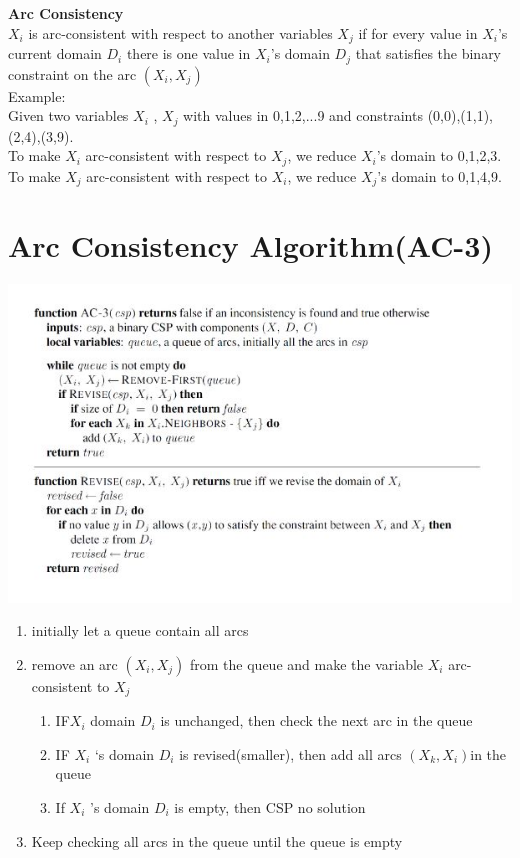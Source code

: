 \textbf{Arc Consistency}\\
$X_i$ is arc-consistent with respect to another variables $X_j$ if for every value in $X_i$’s current domain $D_i$ there is one value in $X_i$’s domain $D_j$ that satisfies the binary constraint on the arc $(X_i , X_j)$\\[3ex]

Example:\\
Given two variables $X_i$ , $X_j$ with values in {0,1,2,...9} and constraints 
(0,0),(1,1),(2,4),(3,9).\\
To make $X_i$ arc-consistent with respect to $X_j$, we reduce $X_i$’s domain to {0,1,2,3}.\\
To make $X_j$ arc-consistent with respect to $X_i$, we reduce $X_j$’s domain to {0,1,4,9}.\\

\section{Arc Consistency Algorithm(AC-3)}
\includegraphics[scale=1]{chap1_pics/1nAyMlelLl-LW-ECO-Akl5AsNAugdRshrNF4o7Q.png} 
\begin{enumerate}
\item initially let a queue contain all arcs
\item remove an arc $(X_i , X_j)$ from the queue and make the variable $X_i$ arc-consistent to $X_j$
\begin{enumerate}
\item IF$ X_i$ domain $D_i$ is unchanged, then check the next arc in the queue
\item IF $X_i$ ‘s domain $D_i$ is revised(smaller), then add all arcs $(X_k, X_i) $in the queue 
\item If $X_i$ ’s domain $D_i$ is empty, then CSP no solution
\end{enumerate}
\item Keep checking all arcs in the queue until the queue is empty 
\end{enumerate}

